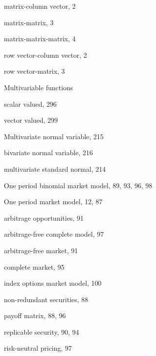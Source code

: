 {\noindent\hspace*{1.4em}matrix-column vector, 2

\noindent\hspace*{1.4em}matrix-matrix, 3

\noindent\hspace*{1.4em}matrix-matrix-matrix, 4

\noindent\hspace*{1.4em}row vector-column vector, 2

\noindent\hspace*{1.4em}row vector-matrix, 3

\noindent Multivariable functions

\noindent\hspace*{1.4em}scalar valued, 296

\noindent\hspace*{1.4em}vector valued, 299

\noindent Multivariate normal variable, 215

\noindent\hspace*{1.4em}bivariate normal variable, 216

\noindent\hspace*{1.4em}multivariate standard normal, 214

\medskip
\noindent One period binomial market model, 89, 93, 96, 98

\noindent One period market model, 12, 87

\noindent\hspace*{1.4em}arbitrage opportunities, 91

\noindent\hspace*{1.4em}arbitrage-free complete model, 97

\noindent\hspace*{1.4em}arbitrage-free market, 91

\noindent\hspace*{1.4em}complete market, 95

\noindent\hspace*{1.4em}index options market model, 100

\noindent\hspace*{1.4em}non-redundant securities, 88

\noindent\hspace*{1.4em}payoff matrix, 88, 96

\noindent\hspace*{1.4em}replicable security, 90, 94

\noindent\hspace*{1.4em}risk-neutral pricing, 97

}
